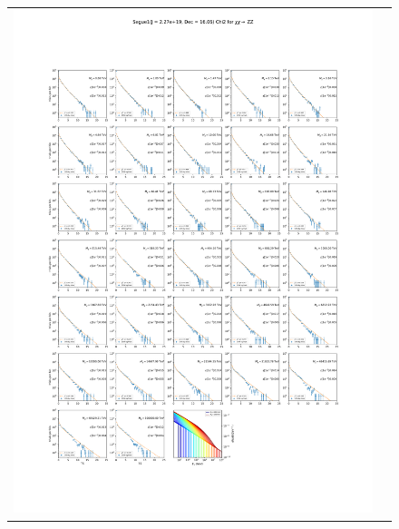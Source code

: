 \begin{figure}[ht]
{\begin{tabular}{cc}
            \includegraphics[clip, trim=22.1cm 6.5cm 19.5cm 56.5cm, scale=0.6]{figures/ic_DM/dm_plots/Segue1_ZZ_chi2_Masspanel_2024-03-23.pdf} &

\end{tabular}}
\end{figure}
